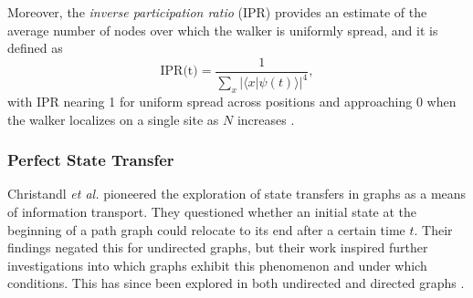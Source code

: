 \documentclass[../../main.tex]{subfiles}
\begin{document}
Moreover, the \textit{inverse participation ratio} (IPR) provides an estimate
of the average number of nodes over which the walker is uniformly spread, and
it is defined as
\begin{equation}
    \text{IPR(t)} = \frac{1}{\sum_{x} |\langle x | \psi(t) \rangle|^4},
\end{equation} 
with IPR nearing 1 for uniform spread across positions and approaching 0 when
the walker localizes on a single site as $N$ increases \cite{Danaci2021}.


%
%

\subsubsection{Perfect State Transfer}

Christandl \textit{et al.} \cite{christandlPerfect04} pioneered the exploration
of state transfers in graphs as a means of information transport. They
questioned whether an initial state at the beginning of a path graph could
relocate to its end after a certain time $t$. Their findings negated this for
undirected graphs, but their work inspired further investigations into which
graphs exhibit this phenomenon and under which conditions. This has since been
explored in both undirected \cite{Coutinho2014, Cheung2014, Zhou2014} and
directed graphs \cite{Lato2020, Cameron2014}.

\end{document}
